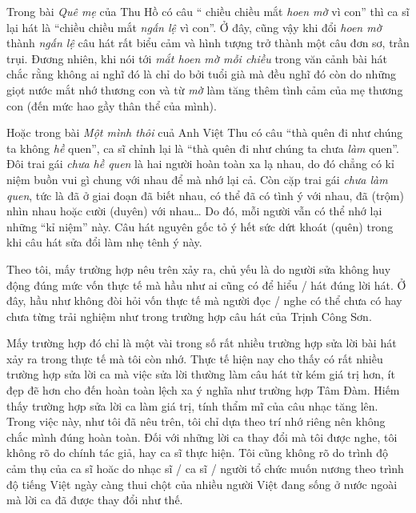 \documentclass[../main.tex]{subfiles}
\begin{document}
\begin{multicols}{2}
Trong bài \textit{Quê mẹ} của Thu Hồ có câu “ chiều chiều mắt \textit{hoen mờ} vì con” thì ca sĩ lại hát là “chiều chiều mắt \textit{ngấn lệ} vì con”.  Ở đây, cũng vậy khi đổi \textit{hoen mờ} thành \textit{ngấn lệ} câu hát rất biểu cảm và hình tượng trở thành một câu đơn sơ, trần trụi.  Đương nhiên, khi nói tới \textit{mắt hoen mờ mỗi chiều} trong văn cảnh bài hát chắc rằng không ai nghĩ đó là chỉ do bởi tuổi già mà đều nghĩ đó còn do những giọt nước mắt nhớ thương con và từ \textit{mờ} làm tăng thêm tình cảm của mẹ thương con (đến mức hao gầy thân thể của mình). 
 
Hoặc trong bài \textit{Một mình thôi} cuả Anh Việt Thu có câu “thà quên đi như chúng ta không \textit{hề} quen”, ca sĩ chỉnh lại là “thà quên đi như chúng ta chưa \textit{làm} quen”.  Đôi trai gái \textit{chưa hề quen} là hai người hoàn toàn xa lạ nhau, do đó chẳng có kỉ niệm buồn vui gì chung với nhau để mà nhớ lại cả. Còn cặp trai gái \textit{chưa làm quen}, tức là đã ở giai đoạn đã biết nhau, có thể đã có tình ý với nhau, đã (trộm) nhìn nhau hoặc cười (duyên) với nhau… Do đó, mỗi người vẫn có thể nhớ lại những “kỉ niệm” này. Câu hát nguyên gốc tỏ ý hết sức dứt khoát (quên) trong khi câu hát sửa đổi làm nhẹ tênh ý này. 
 
Theo tôi, mấy trường hợp nêu trên xảy ra, chủ yếu là do người sửa không huy động đúng mức vốn thực tế mà hầu như ai cũng có để hiểu / hát đúng lời hát. Ở đây, hầu như không đòi hỏi vốn thực tế mà người đọc / nghe có thể chưa có hay chưa từng trải nghiệm như trong trường hợp câu hát của Trịnh Công Sơn. 
 
Mấy trường hợp đó chỉ là một vài trong số rất nhiều trường hợp sửa lời bài hát xảy ra trong thực tế mà tôi còn nhớ. Thực tế hiện nay cho thấy có rất nhiều trường hợp sửa lời ca mà việc sửa lời thường làm câu hát từ kém giá trị hơn, ít đẹp đẽ hơn cho đến hoàn toàn lệch xa ý nghĩa như trường hợp Tâm Đàm. Hiếm thấy trường hợp sửa lời ca làm giá trị, tính thẩm mĩ của câu nhạc tăng lên. Trong việc này, như tôi đã nêu trên, tôi chỉ dựa theo trí nhớ riêng nên không chắc mình đúng hoàn toàn. Đối với những lời ca thay đổi mà tôi được nghe, tôi không rõ do chính tác giả, hay ca sĩ thực hiện. Tôi cũng không rõ do trình độ cảm thụ của ca sĩ hoăc do nhạc sĩ / ca sĩ / người tổ chức muốn nương theo trình độ tiếng Việt ngày càng thui chột của nhiều người Việt đang sống ở nước ngoài mà lời ca đã được thay đổi như thế. 
 

\end{multicols}
\end{document}
